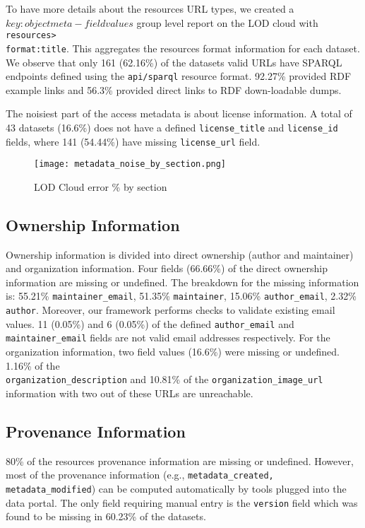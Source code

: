 To have more details about the resources URL types, we created a $key:object meta-field values$ group level report on the LOD cloud with \texttt{resources>\\format:title}. This aggregates the resources format information for each dataset. We observe that only 161 (62.16\%) of the datasets valid URLs have SPARQL endpoints defined using the \texttt{api/sparql} resource format. 92.27\% provided RDF example links and 56.3\% provided direct links to RDF down-loadable dumps.

The noisiest part of the access metadata is about license information. A total of 43 datasets (16.6\%) does not have a defined \texttt{license\_title} and \texttt{license\_id} fields, where 141 (54.44\%) have missing \texttt{license\_url} field.

\begin{figure}[!ht]
  \centering
  \texttt{[image: metadata\_noise\_by\_section.png]}
  \caption{LOD Cloud error \% by section}
  \label{fig:metadata_noise_by_section}
\end{figure}

\subsection{Ownership Information}
Ownership information is divided into direct ownership (author and maintainer) and organization information. Four fields (66.66\%) of the direct ownership information are missing or undefined. The breakdown for the missing information is: 55.21\% \texttt{maintainer\_email}, 51.35\% \texttt{maintainer}, 15.06\% \texttt{author\_email}, 2.32\% \texttt{author}. Moreover, our framework performs checks to validate existing email values. 11 (0.05\%) and 6 (0.05\%) of the defined \texttt{author\_email} and \texttt{maintainer\_email} fields are not valid email addresses respectively. For the organization information, two field values (16.6\%) were missing or undefined. 1.16\% of the \\\texttt{organization\_description} and 10.81\% of the \texttt{organization\-\_image\_url} information with two out of these URLs are unreachable.

\subsection{Provenance Information}
80\% of the resources provenance information are missing or undefined. However, most of the provenance information (e.g., \texttt{metadata\_created, metadata\_modified}) can be computed automatically by tools plugged into the data portal. The only field requiring manual entry is the \texttt{version} field which was found to be missing in 60.23\% of the datasets.

